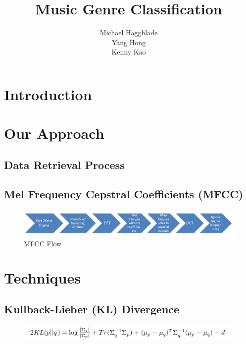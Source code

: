 \documentclass{article} %
\title{Music Genre Classification}
\author{
Michael Haggblade \\
\And
Yang Hong \\
\And
Kenny Kao
}
\begin{document}
\maketitle


\section{Introduction}



\section{Our Approach}

\subsection{Data Retrieval Process}



\subsection{Mel Frequency Cepstral Coefficients (MFCC)}



\begin{figure}[!hb]
  \centering
  \includegraphics[width=.88\textwidth]{images/our_approach-mfcc_flow.png}
  \caption{MFCC Flow}
  \label{fig:mfcc_flow}
\end{figure}


\section{Techniques}

\subsection{Kullback-Lieber (KL) Divergence}



\begin{figure}[!hb]
  \centering
  \includegraphics[width=.88\textwidth]{images/techniques-kldiv-kleqn.png}
\end{figure}
\end{document}
